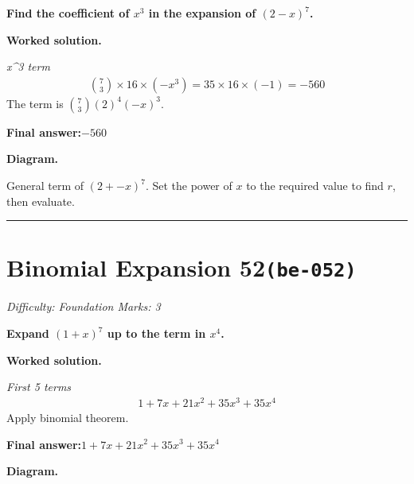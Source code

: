 \documentclass[11pt]{article}
\newcommand{\question}[1]{\par\medskip\noindent\textbf{#1}\par}
\begin{document}
\question{Find the coefficient of \( x^3 \) in the expansion of \( (2 - x)^7 \).}

\textbf{Worked solution.}

\textit{x\textasciicircum 3 term}
\[\begin{gathered}
\binom{7}{3} \times 16 \times (-x^3) = 35 \times 16 \times (-1) = -560
\end{gathered}\]
The term is \( \binom{7}{3}(2)^4(-x)^3 \).

\begin{answerbox}
\textbf{Final answer:}\quad \(\displaystyle -560\)
\end{answerbox}
\textbf{Diagram.}

\begin{center}
\end{center}
\small General term of $\left(2+-x\right)^{7}$. Set the power of $x$ to the required value to find $r$, then evaluate.\normalsize

\medskip\hrule

\section*{Binomial Expansion 52\quad\small\texttt{(be-052)}}
\textit{Difficulty: Foundation \quad\textbar\quad Marks: 3}

\question{Expand \( (1 + x)^7 \) up to the term in \( x^4 \).}

\textbf{Worked solution.}

\textit{First 5 terms}
\[\begin{gathered}
1 + 7x + 21x^2 + 35x^3 + 35x^4
\end{gathered}\]
Apply binomial theorem.

\begin{answerbox}
\textbf{Final answer:}\quad \(\displaystyle 1 + 7x + 21x^2 + 35x^3 + 35x^4\)
\end{answerbox}
\textbf{Diagram.}
\end{document}
